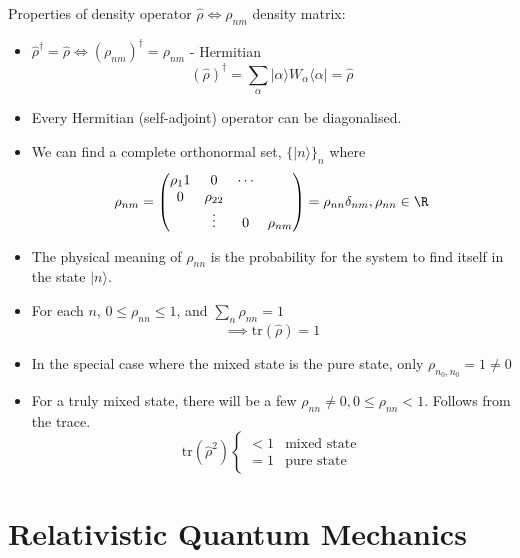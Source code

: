 \documentclass[a4paper, 11pt, normalem]{report}
\begin{document}
Properties of density operator $\hat{\rho} \iff \rho_{nm}$ density matrix:
\begin{itemize}
    \item $\hat{\rho}^\dagger = \hat{\rho} \iff (\rho_{nm})^\dagger = \rho_{nm}$ - Hermitian
        \begin{equation}
            (\hat{\rho})^\dagger = \sum_\alpha |\alpha\rangle W_\alpha \langle\alpha| = \hat{\rho}
        \end{equation}
    \item Every Hermitian (self-adjoint) operator can be diagonalised. 
    \item We can find a complete orthonormal set, $\{|n\rangle\}_n$ where
        \begin{equation}
            \rho_{nm} = \begin{pmatrix} \rho_11 & 0 & \cdots \\ 0 & \rho_{22} & \\ & \vdots & 0 & \rho_{nm}\end{pmatrix} = \rho_{nn}\delta_{nm}, \rho_{nn} \in \R
        \end{equation}
    \item The physical meaning of $\rho_{nn}$ is the probability for the system to find itself in the state $|n\rangle$.
    \item For each $n$, $0 \leq \rho_{nn} \leq 1$, and $\sum_n \rho_{nn} = 1$
        \begin{equation}
            \implies \text{tr}(\hat{\rho}) = 1
        \end{equation}
    \item In the special case where the mixed state is the pure state, only $\rho_{n_0,n_0} = 1 \neq 0$
    \item For a truly mixed state, there will be a few $\rho_{nn} \neq 0, 0 \leq \rho_{nn} < 1$. Follows from the trace.
        \begin{equation}
            \text{tr}(\hat{\rho}^2) \begin{cases} < 1 & \text{mixed state} \\ = 1 & \text{pure state} \end{cases}
        \end{equation}
\end{itemize}

\part{Relativistic Quantum Mechanics}
\end{document}
